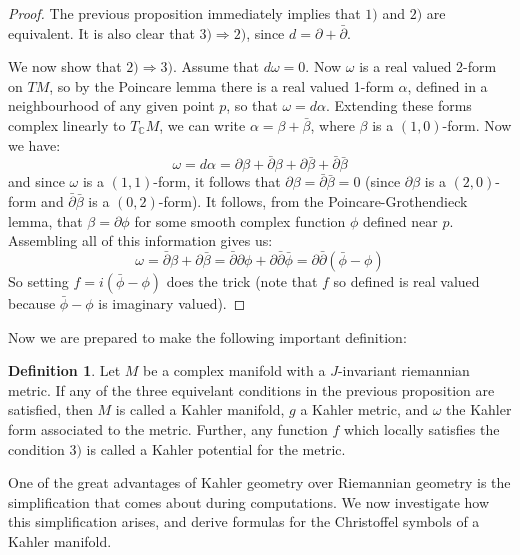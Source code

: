 \documentclass[11pt]{amsart}
\theoremstyle{definition}
\newtheorem{definition}[subsection]{Definition}
\def \C{ \mathbb{C} }
\def \del{ \partial }
\def \delbar{ \bar{\partial} }
\begin{document}
%
\begin{proof}
The previous proposition immediately implies that $1)$ and $2)$ are equivalent. It is also clear that $3) \Rightarrow 2)$, since $d = \del + \delbar$.

We now show that $2) \Rightarrow 3)$.  Assume that $d \omega = 0$.  Now $\omega$ is a real valued 2-form on $TM$, so by the Poincare lemma there is a real valued 1-form $\alpha$, defined in a neighbourhood of any given point $p$, so that $\omega = d \alpha$.  Extending these forms complex linearly to $T_{\C}M$, we can write $\alpha = \beta + \bar{\beta}$, where $\beta$ is a $(1,0)$-form.  Now we have:
%
$$\omega = d \alpha = \del \beta + \delbar \beta + \del \bar{\beta} + \delbar \bar{\beta}$$
%
and since $\omega$ is a $(1,1)$-form, it follows that $\del \beta = \delbar \bar{\beta} = 0$ (since $\del \beta$ is a $(2,0)$-form and $\delbar \bar{\beta}$ is a $(0,2)$-form).  It follows, from the Poincare-Grothendieck lemma, that $\beta = \del \phi$ for some smooth complex function $\phi$ defined near $p$.  Assembling all of this information gives us:
%
$$ \omega = \delbar \beta + \del \bar{\beta} = \delbar \del \phi + \del \delbar \bar{\phi} = \del \delbar( \bar{\phi} - \phi ) $$
%
So setting $f = i( \bar{\phi} - \phi )$ does the trick (note that $f$ so defined is real valued because $\bar{\phi} - \phi$ is imaginary valued).
%
\end{proof}
%
Now we are prepared to make the following important definition:
%
\begin{definition} Let $M$ be a complex manifold with a $J$-invariant riemannian metric.  If any of the three equivelant conditions in the previous proposition are satisfied, then $M$ is called a Kahler manifold, $g$ a Kahler metric, and $\omega$ the Kahler form associated to the metric.  Further, any function $f$ which locally satisfies the condition $3)$ is called a Kahler potential for the metric.
\end{definition}

One of the great advantages of Kahler geometry over Riemannian geometry is the simplification that comes about during computations.  We now investigate how this simplification arises, and derive formulas for the Christoffel symbols of a Kahler manifold.
\end{document}
